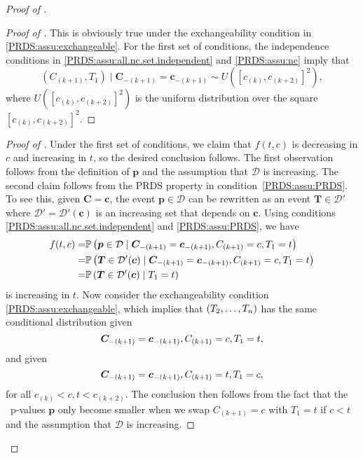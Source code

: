 \begin{proof}[Proof of ]
\begin{proof}[Proof of ]
  This is obviously true under the exchangeability condition in
  \ref{PRDS:assu:exchangeable}.
  For the first set of conditions, the
  independence conditions in \ref{PRDS:assu:all.nc.set.independent} and
  \ref{PRDS:assu:nc} imply that
\[
  \left(C_{(k+1)}, T_1\right) \mid \boldsymbol{C}_{-(k+1)}
  = \boldsymbol{c}_{-(k+1)} \sim U\left(\left[c_{(k)}, c_{(k+2)}\right]^2\right),
\]
where $U\left(\left[c_{(k)}, c_{(k+2)}\right]^2\right)$ is the uniform distribution over the
square $\left[c_{(k)}, c_{(k+2)}\right]^2$.
\renewcommand{\qedsymbol}{}
\end{proof}


\begin{proof}[Proof of ]
  Under the first set of conditions, we claim that $f(t,c)$ is
  decreasing in $c$ and increasing in $t$, so the desired conclusion
  follows. The first observation follows from the definition of $\bm
  p$ and the assumption that $\mathcal{D}$ is increasing. The second
  claim follows from the PRDS property in
  condition~\ref{PRDS:assu:PRDS}. To see this, given $\bm C = \bm c$,
  the event $\bm p \in \mathcal{D}$ can be rewritten as an event $\bm
  T \in \mathcal{D}'$ where $\mathcal{D}' = \mathcal{D}'(\bm c)$ is an
  increasing set that depends on $\bm c$. Using conditions
  \ref{PRDS:assu:all.nc.set.independent} and \ref{PRDS:assu:PRDS}, we
  have
\begin{align*}
  f(t,c)=&\mathbb{P}\left({\boldsymbol{p}} \in \mathcal{D} \mid \boldsymbol{C}_{-(k+1)}
  = \boldsymbol{c}_{-(k+1)}, C_{(k+1)} = c, {T_{1}} = t
  \right) \\
  =& \mathbb{P}\left(\bm T \in \mathcal{D}'(\bm c) \mid \boldsymbol{C}_{-(k+1)}
  = \boldsymbol{c}_{-(k+1)}, C_{(k+1)} = c, {T_{1}} = t
     \right) \\
  =& \mathbb{P}\left(\bm T \in \mathcal{D}'(\bm c) \mid {T_{1}} = t
  \right)
\end{align*}
is increasing in $t$.
Now consider the exchangeability condition
\ref{PRDS:assu:exchangeable}, which implies that $(T_2,\dotsc,T_{{n}})$ has
the same conditional distribution given
\[
\boldsymbol{C}_{-(k+1)}
  = \boldsymbol{c}_{-(k+1)}, C_{(k+1)} = c, {T_{1}} = t,
\]
and given
\[
\boldsymbol{C}_{-(k+1)}
  = \boldsymbol{c}_{-(k+1)}, C_{(k+1)} = t, {T_{1}} = c,
\]
for all $c_{(k)} < c, t < c_{(k+2)}$. The conclusion then follows from
the fact that the \nickname~p-values $\bm p$ only become smaller when
we swap $C_{(k+1)} = c$ with $T_1 = t$ if $c < t$ and the assumption
that $\mathcal{D}$ is increasing.
\renewcommand{\qedsymbol}{}
\end{proof}


\end{proof}
